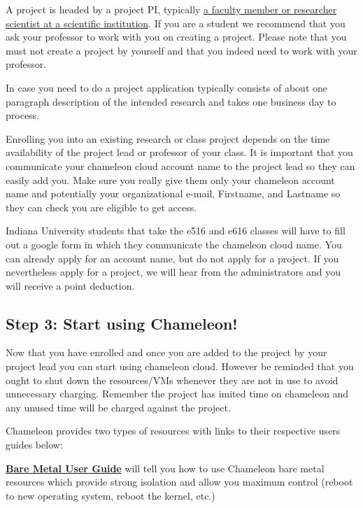 A project is headed by a project PI, typically
\href{https://www.chameleoncloud.org/docs/user-faq/\#toc-who-is-eligible-to-be-chameleon-pi-and-how-do-i-make-sure-that-my-pi-status-is-reflected-in-my-profile-}{a
faculty member or researcher scientist at a scientific institution}. If
you are a student we recommend that you ask your professor to work with
you on creating a project. Please note that you must not create a
project by yourself and that you indeed need to work with your
professor. 

In case you need to do a project application typically consists of
about one paragraph description of the intended research and takes one
business day to process.

Enrolling you into an existing research or class project depends on
the time availability of the project lead or professor of your
class. It is important that you communicate your chameleon cloud
account name to the project lead so they can easily add you. Make sure
you really give them only your chameleon account name and potentially
your organizational e-mail, Firstname, and Lastname so they can check
you are eligible to get access. 

\begin{IU}
Indiana University students that take the e516 and e616 classes will
have to fill out a google form in which they communicate the chameleon
cloud name. You can already apply for an account name, but do not
apply for a project. If you nevertheless apply for a project, we will
hear from the administrators and you will receive a point deduction.
\end{IU}

\subsection{Step 3: Start using Chameleon!}\label{using-chameleon}

Now that you have enrolled and once you are added to the project by your
project lead you can start using chameleon cloud. However be reminded
that you ought to shut down the resources/VMs whenever they are not in
use to avoid unnecessary charging. Remember the project has imited
time on chameleon and any unused time will be charged against the project.

Chameleon provides two types of resources with links to their respective
users guides below:

\textbf{\href{https://www.chameleoncloud.org/docs/bare-metal-user-guide-old/}{Bare
Metal User Guide}} will tell you how to use Chameleon bare metal
resources which provide strong isolation and allow you maximum control
(reboot to new operating system, reboot the kernel, etc.)

